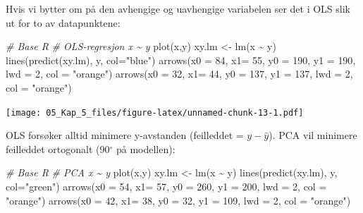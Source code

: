 \documentclass[
]{article}
\newenvironment{Shaded}{\begin{snugshade}}{\end{snugshade}}
\newcommand{\AttributeTok}[1]{\textcolor[rgb]{0.77,0.63,0.00}{#1}}
\newcommand{\CommentTok}[1]{\textcolor[rgb]{0.56,0.35,0.01}{\textit{#1}}}
\newcommand{\DecValTok}[1]{\textcolor[rgb]{0.00,0.00,0.81}{#1}}
\newcommand{\FunctionTok}[1]{\textcolor[rgb]{0.00,0.00,0.00}{#1}}
\newcommand{\NormalTok}[1]{#1}
\newcommand{\OtherTok}[1]{\textcolor[rgb]{0.56,0.35,0.01}{#1}}
\newcommand{\SpecialCharTok}[1]{\textcolor[rgb]{0.00,0.00,0.00}{#1}}
\newcommand{\StringTok}[1]{\textcolor[rgb]{0.31,0.60,0.02}{#1}}
\begin{document}
Hvis vi bytter om på den avhengige og uavhengige variabelen ser det i OLS slik ut for to av datapunktene:

\begin{Shaded}
\begin{Highlighting}[]
\CommentTok{\# Base R}
\CommentTok{\# OLS{-}regresjon x \textasciitilde{} y}
\FunctionTok{plot}\NormalTok{(x,y)}
\NormalTok{xy.lm }\OtherTok{\textless{}{-}} \FunctionTok{lm}\NormalTok{(x }\SpecialCharTok{\textasciitilde{}}\NormalTok{ y)}
\FunctionTok{lines}\NormalTok{(}\FunctionTok{predict}\NormalTok{(xy.lm), y, }\AttributeTok{col=}\StringTok{"blue"}\NormalTok{)}
\FunctionTok{arrows}\NormalTok{(}\AttributeTok{x0 =} \DecValTok{84}\NormalTok{, }\AttributeTok{x1=} \DecValTok{55}\NormalTok{, }\AttributeTok{y0 =} \DecValTok{190}\NormalTok{, }\AttributeTok{y1 =} \DecValTok{190}\NormalTok{, }\AttributeTok{lwd =} \DecValTok{2}\NormalTok{, }\AttributeTok{col =} \StringTok{"orange"}\NormalTok{)}
\FunctionTok{arrows}\NormalTok{(}\AttributeTok{x0 =} \DecValTok{32}\NormalTok{, }\AttributeTok{x1=} \DecValTok{44}\NormalTok{, }\AttributeTok{y0 =} \DecValTok{137}\NormalTok{, }\AttributeTok{y1 =} \DecValTok{137}\NormalTok{, }\AttributeTok{lwd =} \DecValTok{2}\NormalTok{, }\AttributeTok{col =} \StringTok{"orange"}\NormalTok{)}
\end{Highlighting}
\end{Shaded}

\texttt{[image: 05\_Kap\_5\_files/figure-latex/unnamed-chunk-13-1.pdf]}

OLS forsøker alltid minimere y-avstanden (feilleddet = \(y-\hat{y}\)). PCA vil minimere feilleddet ortogonalt (90\(^\circ\) på modellen):

\begin{Shaded}
\begin{Highlighting}[]
\CommentTok{\# Base R}
\CommentTok{\# PCA x \textasciitilde{} y}
\FunctionTok{plot}\NormalTok{(x,y)}
\NormalTok{xy.lm }\OtherTok{\textless{}{-}} \FunctionTok{lm}\NormalTok{(x }\SpecialCharTok{\textasciitilde{}}\NormalTok{ y)}
\FunctionTok{lines}\NormalTok{(}\FunctionTok{predict}\NormalTok{(xy.lm), y, }\AttributeTok{col=}\StringTok{"green"}\NormalTok{)}
\FunctionTok{arrows}\NormalTok{(}\AttributeTok{x0 =} \DecValTok{54}\NormalTok{, }\AttributeTok{x1=} \DecValTok{57}\NormalTok{, }\AttributeTok{y0 =} \DecValTok{260}\NormalTok{, }\AttributeTok{y1 =} \DecValTok{200}\NormalTok{, }\AttributeTok{lwd =} \DecValTok{2}\NormalTok{, }\AttributeTok{col =} \StringTok{"orange"}\NormalTok{)}
\FunctionTok{arrows}\NormalTok{(}\AttributeTok{x0 =} \DecValTok{42}\NormalTok{, }\AttributeTok{x1=} \DecValTok{38}\NormalTok{, }\AttributeTok{y0 =} \DecValTok{32}\NormalTok{, }\AttributeTok{y1 =} \DecValTok{109}\NormalTok{, }\AttributeTok{lwd =} \DecValTok{2}\NormalTok{, }\AttributeTok{col =} \StringTok{"orange"}\NormalTok{)}
\end{Highlighting}
\end{Shaded}
\end{document}
